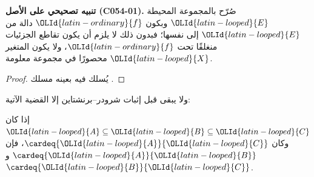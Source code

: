 \documentclass[../../../include/open-logic-section]{subfiles}
\begin{document}
\textbf{تنبيه تصحيحي على الأصل (C054-01).} صُرّح بالمجموعة المحيطة ${\OLId{latin-looped}{E}}$ وبكون
${\OLId{latin-ordinary}{f}}$ دالة من ${\OLId{latin-looped}{E}}$ إلى نفسها؛ فبدون ذلك لا يلزم أن يكون تقاطع الجزئيات
منغلقًا تحت ${\OLId{latin-ordinary}{f}}$، ولا يكون المتغير ${\OLId{latin-looped}{X}}$ محصورًا في مجموعة معلومة.

\begin{proof}
يُسلك فيه بعينه مسلك .
\end{proof}

ولا يبقى قبل إثبات شرودر–برنشتاين إلا القضية الآتية:

\begin{prop}
إذا كان ${\OLId{latin-looped}{A}} \subseteq {\OLId{latin-looped}{B}} \subseteq {\OLId{latin-looped}{C}}$ وكان $\cardeq{{\OLId{latin-looped}{A}}}{{\OLId{latin-looped}{C}}}$، فإن $\cardeq{{\OLId{latin-looped}{A}}}{{\OLId{latin-looped}{B}}}$ و$\cardeq{{\OLId{latin-looped}{B}}}{{\OLId{latin-looped}{C}}}$.
\end{prop}
\end{document}

